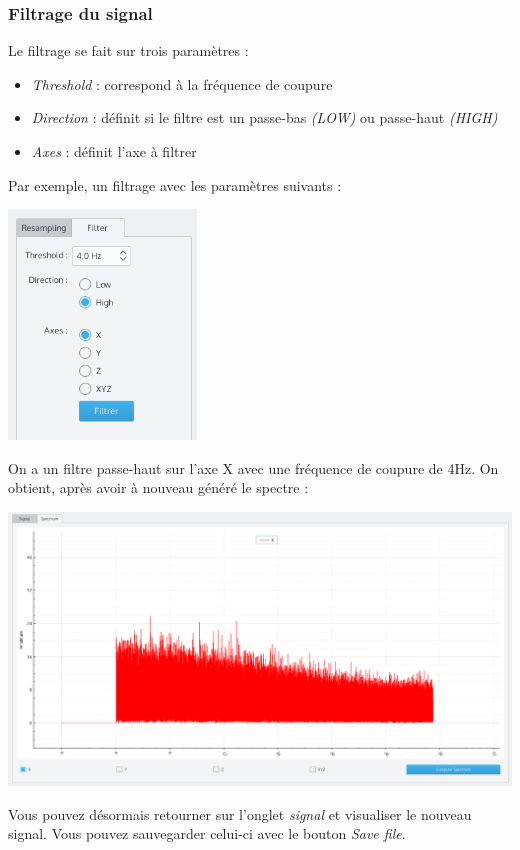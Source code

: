 \documentclass[a4paper,12pt]{article}
\begin{document}
\subsubsection{Filtrage du signal}
Le filtrage se fait sur trois paramètres :
\begin{itemize}
 \item \emph{Threshold} : correspond à la fréquence de coupure
 \item \emph{Direction} : définit si le filtre est un passe-bas \emph{(LOW)} ou passe-haut \emph{(HIGH)}
 \item \emph{Axes} : définit l'axe à filtrer
\end{itemize}
Par exemple, un filtrage avec les paramètres suivants :
\begin{center}
 \includegraphics[width=5cm]{img/filterParams.png}
\end{center}
On a un filtre passe-haut sur l'axe X avec une fréquence de coupure de 4Hz. On obtient, après avoir à nouveau généré le spectre :
\begin{center}
 \includegraphics[width=17cm]{img/filteredSpectrum.png}
\end{center}
Vous pouvez désormais retourner sur l'onglet \emph{signal} et visualiser le nouveau signal. Vous pouvez sauvegarder celui-ci avec le bouton \emph{Save file}.
\end{document}
